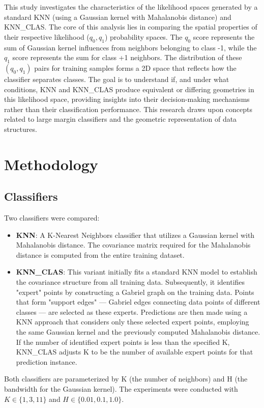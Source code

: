 \documentclass[conference]{IEEEtran}
\begin{document}
This study investigates the characteristics of the likelihood spaces generated by a standard KNN (using a Gaussian kernel with Mahalanobis distance) and KNN\_CLAS. The core of this analysis lies in comparing the spatial properties of their respective likelihood ($q_0, q_1$) probability spaces. The $q_0$ score represents the sum of Gaussian kernel influences from neighbors belonging to class -1, while the $q_1$ score represents the sum for class +1 neighbors. The distribution of these $(q_0, q_1)$ pairs for training samples forms a 2D space that reflects how the classifier separates classes. The goal is to understand if, and under what conditions, KNN and KNN\_CLAS produce equivalent or differing geometries in this likelihood space, providing insights into their decision-making mechanisms rather than their classification performance. This research draws upon concepts related to large margin classifiers and the geometric representation of data structures.

\section{Methodology}
\subsection{Classifiers}
Two classifiers were compared:
\begin{itemize}
    \item \textbf{KNN}: A K-Nearest Neighbors classifier that utilizes a Gaussian kernel with Mahalanobis distance. The covariance matrix required for the Mahalanobis distance is computed from the entire training dataset.
    \item \textbf{KNN\_CLAS}: This variant initially fits a standard KNN model to establish the covariance structure from all training data. Subsequently, it identifies "expert" points by constructing a Gabriel graph on the training data. Points that form "support edges" — Gabriel edges connecting data points of different classes — are selected as these experts. Predictions are then made using a KNN approach that considers only these selected expert points, employing the same Gaussian kernel and the previously computed Mahalanobis distance. If the number of identified expert points is less than the specified K, KNN\_CLAS adjusts K to be the number of available expert points for that prediction instance.
\end{itemize}
Both classifiers are parameterized by K (the number of neighbors) and H (the bandwidth for the Gaussian kernel). The experiments were conducted with $K \in \{1, 3, 11\}$ and $H \in \{0.01, 0.1, 1.0\}$.
\end{document}
